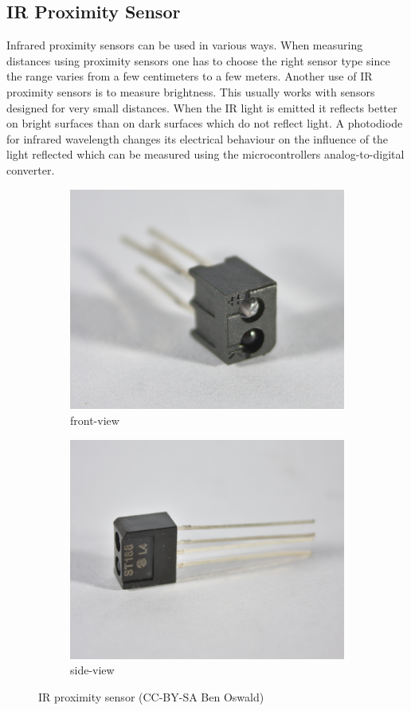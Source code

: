 \subsection{IR Proximity Sensor}
Infrared proximity sensors can be used in various ways. When measuring distances using proximity sensors one has to choose the right sensor type since the range varies from a few centimeters to a few meters. Another use of IR proximity sensors is to measure brightness. This usually works with sensors designed for very small distances. When the IR light is emitted it reflects better on bright surfaces than on dark surfaces which do not reflect light. A photodiode for infrared wavelength changes its electrical behaviour on the influence of the light reflected which can be measured using the microcontrollers analog-to-digital converter.

\begin{figure}[H]
  \centering
  \begin{subfigure}{0.48\textwidth}
  \centering
  \includegraphics[width=0.9\linewidth]{images/30_proximity_front.jpg}
  \caption{front-view}
  \end{subfigure}
  \begin{subfigure}{0.48\textwidth}
  \centering
  \includegraphics[width=0.9\linewidth]{images/30_proximity_back.jpg}
  \caption{side-view}
  \end{subfigure}
  \caption{IR proximity sensor (CC-BY-SA Ben Oswald)}
\end{figure}

